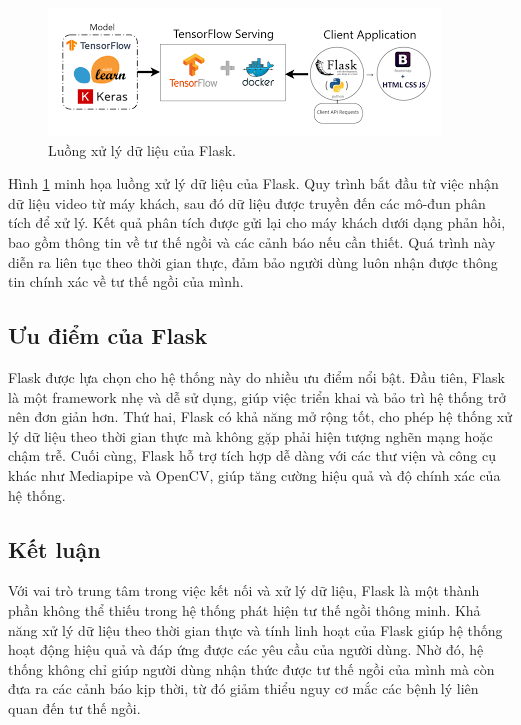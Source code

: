 \documentclass[conference]{IEEEtran}
\begin{document}
\begin{figure}[H]
    \centering
    \includegraphics[width=0.9\linewidth]{images/flask_workflow.png}
    \caption{Luồng xử lý dữ liệu của Flask.}
    \label{fig:flask_workflow}
\end{figure}

Hình \ref{fig:flask_workflow} minh họa luồng xử lý dữ liệu của Flask. Quy trình bắt đầu từ việc nhận dữ liệu video từ máy khách, sau đó dữ liệu được truyền đến các mô-đun phân tích để xử lý. Kết quả phân tích được gửi lại cho máy khách dưới dạng phản hồi, bao gồm thông tin về tư thế ngồi và các cảnh báo nếu cần thiết. Quá trình này diễn ra liên tục theo thời gian thực, đảm bảo người dùng luôn nhận được thông tin chính xác về tư thế ngồi của mình.

\subsection{Ưu điểm của Flask}
Flask được lựa chọn cho hệ thống này do nhiều ưu điểm nổi bật. Đầu tiên, Flask là một framework nhẹ và dễ sử dụng, giúp việc triển khai và bảo trì hệ thống trở nên đơn giản hơn. Thứ hai, Flask có khả năng mở rộng tốt, cho phép hệ thống xử lý dữ liệu theo thời gian thực mà không gặp phải hiện tượng nghẽn mạng hoặc chậm trễ. Cuối cùng, Flask hỗ trợ tích hợp dễ dàng với các thư viện và công cụ khác như Mediapipe và OpenCV, giúp tăng cường hiệu quả và độ chính xác của hệ thống.

\subsection{Kết luận}
Với vai trò trung tâm trong việc kết nối và xử lý dữ liệu, Flask là một thành phần không thể thiếu trong hệ thống phát hiện tư thế ngồi thông minh. Khả năng xử lý dữ liệu theo thời gian thực và tính linh hoạt của Flask giúp hệ thống hoạt động hiệu quả và đáp ứng được các yêu cầu của người dùng. Nhờ đó, hệ thống không chỉ giúp người dùng nhận thức được tư thế ngồi của mình mà còn đưa ra các cảnh báo kịp thời, từ đó giảm thiểu nguy cơ mắc các bệnh lý liên quan đến tư thế ngồi.
\end{document}
